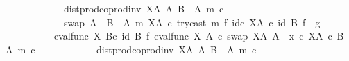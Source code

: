 \begin{isabellebody}
\ \ \ \ \ \ \ \ \ \ \ \ dist{\isacharunderscore}{\kern0pt}prod{\isacharunderscore}{\kern0pt}coprod{\isacharunderscore}{\kern0pt}inv\ {\isacharparenleft}{\kern0pt}X\isactrlbsup A\isactrlesup {\isacharparenright}{\kern0pt}\ A\ {\isacharparenleft}{\kern0pt}B\ {\isasymsetminus}\ {\isacharparenleft}{\kern0pt}A{\isacharcomma}{\kern0pt}\ m{\isacharparenright}{\kern0pt}{\isacharparenright}{\kern0pt}\ {\isasymcirc}\isactrlsub c\isanewline
\ \ \ \ \ \ \ \ \ \ \ \ swap\ {\isacharparenleft}{\kern0pt}A\ {\isasymCoprod}\ {\isacharparenleft}{\kern0pt}B\ {\isasymsetminus}\ {\isacharparenleft}{\kern0pt}A{\isacharcomma}{\kern0pt}\ m{\isacharparenright}{\kern0pt}{\isacharparenright}{\kern0pt}{\isacharparenright}{\kern0pt}\ {\isacharparenleft}{\kern0pt}X\isactrlbsup A\isactrlesup {\isacharparenright}{\kern0pt}\ {\isasymcirc}\isactrlsub c\ try{\isacharunderscore}{\kern0pt}cast\ m\ {\isasymtimes}\isactrlsub f\ id\isactrlsub c\ {\isacharparenleft}{\kern0pt}X\isactrlbsup A\isactrlesup {\isacharparenright}{\kern0pt}{\isacharparenright}{\kern0pt}\isactrlsup {\isasymsharp}{\isacharparenright}{\kern0pt}{\isacharparenright}{\kern0pt}{\isacharparenright}{\kern0pt}\ {\isasymcirc}\isactrlsub c\ {\isacharparenleft}{\kern0pt}id\ B\ {\isasymtimes}\isactrlsub f\ \ g{\isacharparenright}{\kern0pt}\ {\isacharequal}{\kern0pt}\ \isanewline
\ \ \ \ \ \ \ \ \ \ {\isacharparenleft}{\kern0pt}{\isacharparenleft}{\kern0pt}eval{\isacharunderscore}{\kern0pt}func\ X\ B{\isacharparenright}{\kern0pt}{\isasymcirc}\isactrlsub c\ {\isacharparenleft}{\kern0pt}id\ B\ {\isasymtimes}\isactrlsub f\ {\isacharparenleft}{\kern0pt}{\isacharparenleft}{\kern0pt}{\isacharparenleft}{\kern0pt}eval{\isacharunderscore}{\kern0pt}func\ X\ A\ {\isasymcirc}\isactrlsub c\ swap\ {\isacharparenleft}{\kern0pt}X\isactrlbsup A\isactrlesup {\isacharparenright}{\kern0pt}\ A{\isacharparenright}{\kern0pt}\ {\isasymamalg}\ {\isacharparenleft}{\kern0pt}x\ {\isasymcirc}\isactrlsub c\ {\isasymbeta}\isactrlbsub X\isactrlbsup A\isactrlesup \ {\isasymtimes}\isactrlsub c\ {\isacharparenleft}{\kern0pt}B\ {\isasymsetminus}\ {\isacharparenleft}{\kern0pt}A{\isacharcomma}{\kern0pt}\ m{\isacharparenright}{\kern0pt}{\isacharparenright}{\kern0pt}\isactrlesub {\isacharparenright}{\kern0pt}\ {\isasymcirc}\isactrlsub c\isanewline
\ \ \ \ \ \ \ \ \ \ \ \ dist{\isacharunderscore}{\kern0pt}prod{\isacharunderscore}{\kern0pt}coprod{\isacharunderscore}{\kern0pt}inv\ {\isacharparenleft}{\kern0pt}X\isactrlbsup A\isactrlesup {\isacharparenright}{\kern0pt}\ A\ {\isacharparenleft}{\kern0pt}B\ {\isasymsetminus}\ {\isacharparenleft}{\kern0pt}A{\isacharcomma}{\kern0pt}\ m{\isacharparenright}{\kern0pt}{\isacharparenright}{\kern0pt}\ {\isasymcirc}\isactrlsub c\isanewline

\end{isabellebody}
